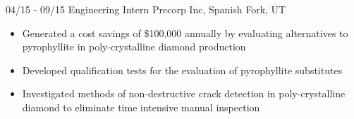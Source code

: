 \documentclass[]{friggeri-cv}
\begin{document}
\begin{entrylist}

  \entry
    {04/15 - 09/15}
    {Engineering Intern}
    {Precorp Inc, Spanish Fork, UT}
    {\vspace{-4mm}
    \begin{itemize}
        \item Generated a cost savings of \$100,000 annually by evaluating alternatives to pyrophyllite in poly-crystalline diamond production
        \item Developed qualification tests for the evaluation of pyrophyllite substitutes
        \item Investigated methods of non-destructive crack detection in poly-crystalline diamond to eliminate time intensive manual inspection
     \end{itemize}\vspace{1mm}}

\end{entrylist}
\end{document}
